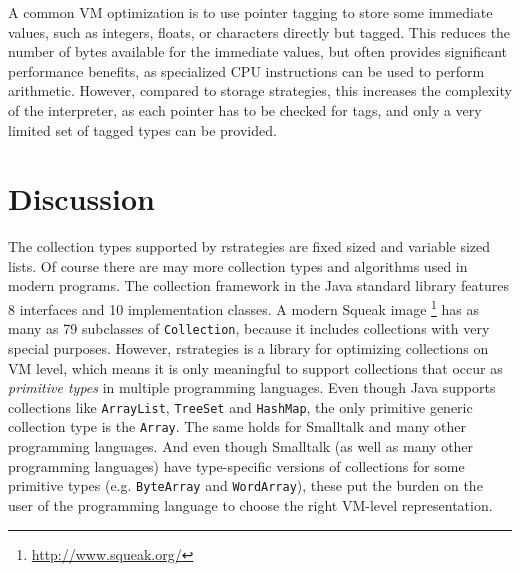 \documentclass[english,10pt]{sigplanconf}
\begin{document}
A common VM optimization is to use pointer tagging to store some immediate
values, such as integers, floats, or characters directly but tagged. This reduces the
number of bytes available for the immediate values, but often provides
significant performance benefits, as specialized CPU instructions can be used
to perform arithmetic. However, compared to storage strategies, this increases
the complexity of the interpreter, as each pointer has to be checked for tags,
and only a very limited set of tagged types can be provided.

\section{Discussion}
\label{sec:discussion}


The collection types supported by rstrategies are fixed sized and
variable sized lists.  Of course there are may more collection types
and algorithms used in modern programs.  The collection framework in
the Java standard library features 8 interfaces and 10 implementation
classes.  A modern Squeak image%
\footnote{\url{http://www.squeak.org/}} has as many as 79 subclasses
of \lstinline{Collection}, because it includes collections with very
special purposes.  However, rstrategies is a library for optimizing
collections on VM level, which means it is only meaningful to support
collections that occur as \emph{primitive types} in multiple
programming languages.  Even though Java supports collections like
\lstinline{ArrayList}, \lstinline{TreeSet} and \lstinline{HashMap},
the only primitive generic collection type is the \lstinline{Array}.
The same holds for Smalltalk and many other programming languages. And
even though Smalltalk (as well as many other programming languages)
have type-specific versions of collections for some primitive types
(e.g. \lstinline{ByteArray} and \lstinline{WordArray}), these put the burden
on the user of the programming language to choose the right VM-level
representation.
\end{document}
